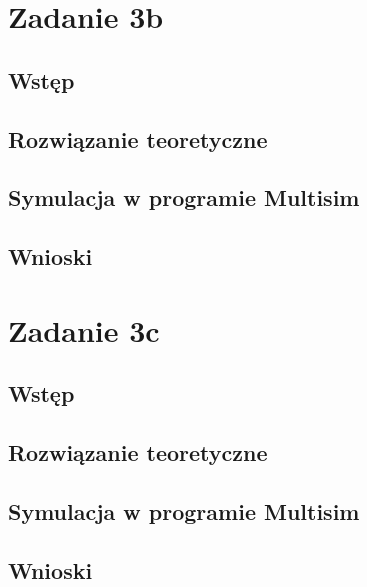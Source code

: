 \documentclass[12pt,a4paper,openright]{mwrep}
\begin{document}
\chapter{Zadanie 3b}
\section{Wstęp}
\section{Rozwiązanie teoretyczne}
\section{Symulacja w programie Multisim}
\section{Wnioski}

\chapter{Zadanie 3c}
\section{Wstęp}
\section{Rozwiązanie teoretyczne}
\section{Symulacja w programie Multisim}
\section{Wnioski}
\end{document}
